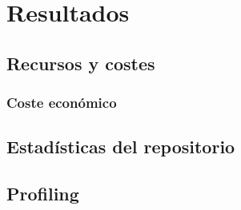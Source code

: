 \chapter{Resultados}
\label{chap:resultados}

\section{Recursos y costes}
\subsection{Coste económico}
\section{Estadísticas del repositorio}
\section{Profiling}